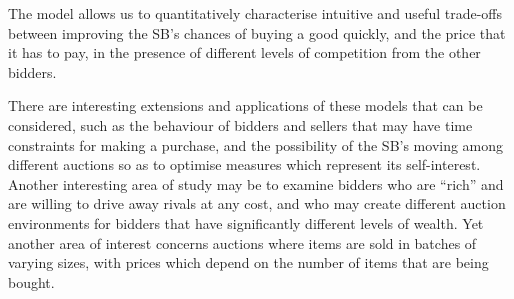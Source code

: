 \documentclass{comjnl}
\begin{document}
The model allows us to quantitatively characterise intuitive and
useful trade-offs between improving the SB's chances of buying a
good quickly, and the price that it has to pay, in the presence of
different levels of competition from the other bidders.


There are interesting extensions and applications of these models
that can be considered, such as the behaviour of bidders and
sellers that may have time constraints for making a purchase, and
the possibility of the SB's moving among different auctions so as
to optimise measures which represent its self-interest. Another
interesting area of study may be to examine bidders who are
``rich'' and are willing to drive away rivals at any cost, and who
may create different auction environments for bidders that have
significantly different levels of wealth. Yet another area of
interest concerns auctions where items are sold in batches of
varying sizes, with prices which depend on the number of items
that are being bought.



\nocite{*}


% 

\end{document}

